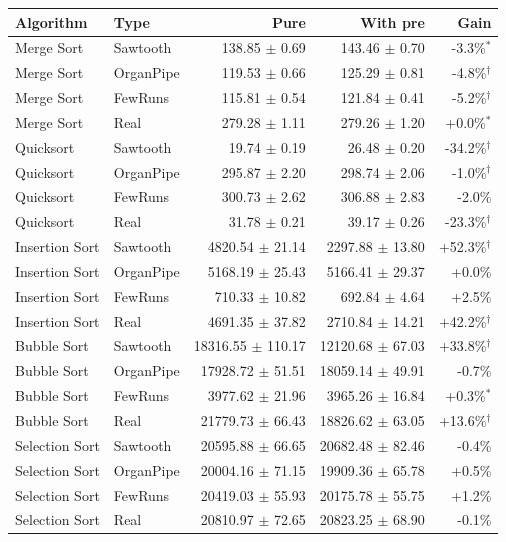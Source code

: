\begin{tabular*}{\textwidth}{@{\extracolsep\fill}llrrr@{\extracolsep\fill}}
\toprule
Algorithm & Type & Pure & With pre & Gain\\
\midrule
Merge Sort & Sawtooth & 138.85 $\pm$ 0.69 & 143.46 $\pm$ 0.70 & -3.3\%$^{*}$ \\
Merge Sort & OrganPipe & 119.53 $\pm$ 0.66 & 125.29 $\pm$ 0.81 & -4.8\%$^{\dagger}$ \\
Merge Sort & FewRuns & 115.81 $\pm$ 0.54 & 121.84 $\pm$ 0.41 & -5.2\%$^{\dagger}$ \\
Merge Sort & Real & 279.28 $\pm$ 1.11 & 279.26 $\pm$ 1.20 & +0.0\%$^{*}$ \\
Quicksort & Sawtooth & 19.74 $\pm$ 0.19 & 26.48 $\pm$ 0.20 & -34.2\%$^{\dagger}$ \\
Quicksort & OrganPipe & 295.87 $\pm$ 2.20 & 298.74 $\pm$ 2.06 & -1.0\%$^{\dagger}$ \\
Quicksort & FewRuns & 300.73 $\pm$ 2.62 & 306.88 $\pm$ 2.83 & -2.0\% \\
Quicksort & Real & 31.78 $\pm$ 0.21 & 39.17 $\pm$ 0.26 & -23.3\%$^{\dagger}$ \\
Insertion Sort & Sawtooth & 4820.54 $\pm$ 21.14 & 2297.88 $\pm$ 13.80 & +52.3\%$^{\dagger}$ \\
Insertion Sort & OrganPipe & 5168.19 $\pm$ 25.43 & 5166.41 $\pm$ 29.37 & +0.0\% \\
Insertion Sort & FewRuns & 710.33 $\pm$ 10.82 & 692.84 $\pm$ 4.64 & +2.5\% \\
Insertion Sort & Real & 4691.35 $\pm$ 37.82 & 2710.84 $\pm$ 14.21 & +42.2\%$^{\dagger}$ \\
Bubble Sort & Sawtooth & 18316.55 $\pm$ 110.17 & 12120.68 $\pm$ 67.03 & +33.8\%$^{\dagger}$ \\
Bubble Sort & OrganPipe & 17928.72 $\pm$ 51.51 & 18059.14 $\pm$ 49.91 & -0.7\% \\
Bubble Sort & FewRuns & 3977.62 $\pm$ 21.96 & 3965.26 $\pm$ 16.84 & +0.3\%$^{*}$ \\
Bubble Sort & Real & 21779.73 $\pm$ 66.43 & 18826.62 $\pm$ 63.05 & +13.6\%$^{\dagger}$ \\
Selection Sort & Sawtooth & 20595.88 $\pm$ 66.65 & 20682.48 $\pm$ 82.46 & -0.4\% \\
Selection Sort & OrganPipe & 20004.16 $\pm$ 71.15 & 19909.36 $\pm$ 65.78 & +0.5\% \\
Selection Sort & FewRuns & 20419.03 $\pm$ 55.93 & 20175.78 $\pm$ 55.75 & +1.2\% \\
Selection Sort & Real & 20810.97 $\pm$ 72.65 & 20823.25 $\pm$ 68.90 & -0.1\% \\

\end{tabular*}
